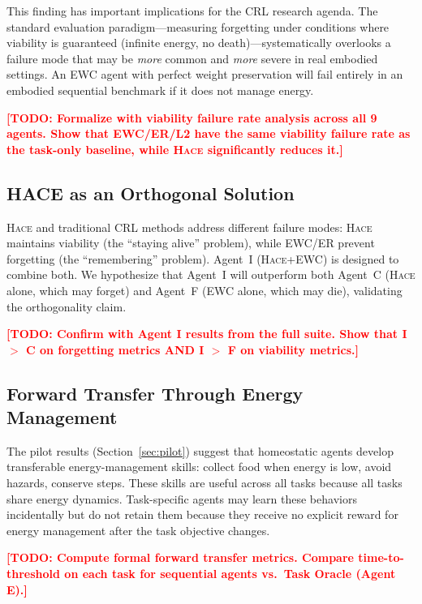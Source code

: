 \documentclass{article}
\newcommand{\todo}[1]{\textcolor{red}{\textbf{[TODO: #1]}}}
\newcommand{\hace}{\textsc{Hace}}
\begin{document}
This finding has important implications for the CRL research agenda.
The standard evaluation paradigm—measuring forgetting under conditions
where viability is guaranteed (infinite energy, no death)—systematically
overlooks a failure mode that may be \emph{more} common and \emph{more}
severe in real embodied settings. An EWC agent with perfect weight
preservation will fail entirely in an embodied sequential benchmark if
it does not manage energy.

\todo{Formalize with viability failure rate analysis across all 9 agents.
Show that EWC/ER/L2 have the same viability failure rate as the task-only
baseline, while \hace{} significantly reduces it.}

\subsection{HACE as an Orthogonal Solution}

\hace{} and traditional CRL methods address different failure modes:
\hace{} maintains viability (the ``staying alive'' problem), while
EWC/ER prevent forgetting (the ``remembering'' problem). Agent~I
(\hace{}+EWC) is designed to combine both. We hypothesize that Agent~I
will outperform both Agent~C (\hace{} alone, which may forget) and
Agent~F (EWC alone, which may die), validating the orthogonality claim.

\todo{Confirm with Agent I results from the full suite. Show that
I $>$ C on forgetting metrics AND I $>$ F on viability metrics.}

\subsection{Forward Transfer Through Energy Management}

The pilot results (Section~\ref{sec:pilot}) suggest that homeostatic
agents develop transferable energy-management skills: collect food when
energy is low, avoid hazards, conserve steps. These skills are useful
across all tasks because all tasks share energy dynamics. Task-specific
agents may learn these behaviors incidentally but do not retain them
because they receive no explicit reward for energy management after
the task objective changes.

\todo{Compute formal forward transfer metrics. Compare time-to-threshold
on each task for sequential agents vs.\ Task Oracle (Agent E).}

\end{document}
